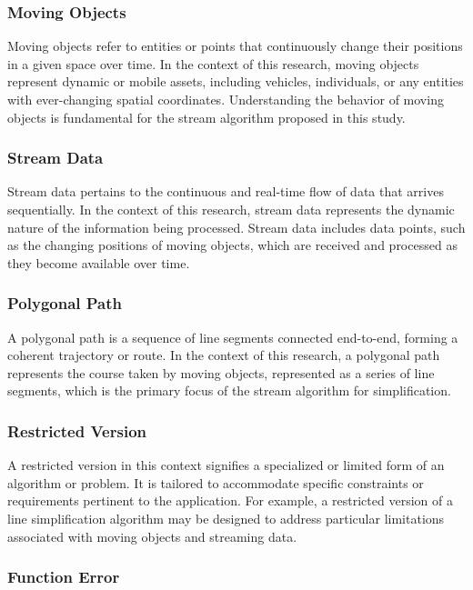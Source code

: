 \documentclass[twoside,12pt, a4paper]{report}
\begin{document}
\subsubsection{Moving Objects} 

Moving objects refer to entities or points that continuously change their positions in a given space over time. In the context of this research, moving objects represent dynamic or mobile assets, including vehicles, individuals, or any entities with ever-changing spatial coordinates. Understanding the behavior of moving objects is fundamental for the stream algorithm proposed in this study.

\subsubsection{Stream Data} 

Stream data pertains to the continuous and real-time flow of data that arrives sequentially. In the context of this research, stream data represents the dynamic nature of the information being processed. Stream data includes data points, such as the changing positions of moving objects, which are received and processed as they become available over time.


\subsubsection{Polygonal Path} 

A polygonal path is a sequence of line segments connected end-to-end, forming a coherent trajectory or route. In the context of this research, a polygonal path represents the course taken by moving objects, represented as a series of line segments, which is the primary focus of the stream algorithm for simplification.


\subsubsection{Restricted Version} 

A restricted version in this context signifies a specialized or limited form of an algorithm or problem. It is tailored to accommodate specific constraints or requirements pertinent to the application. For example, a restricted version of a line simplification algorithm may be designed to address particular limitations associated with moving objects and streaming data.



\subsubsection{Function Error} 
\end{document}
